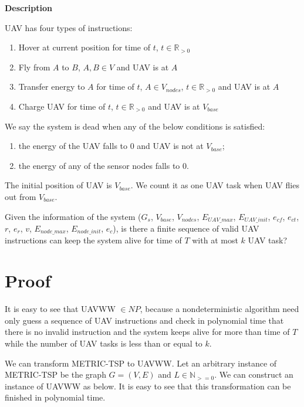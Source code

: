\documentclass[11pt]{article}
\begin{document}
\noindent
\textbf{Description}

UAV has four types of instructions:
\begin{enumerate}[noitemsep]
\item Hover at current position for time of $t$, $t \in \mathbb{R}_{>0}$
\item Fly from $A$ to $B$, $A,B \in V$ and UAV is at $A$
\item Transfer energy to $A$ for time of $t$, $A \in V_{nodes}$, $t \in \mathbb{R}_{>0}$ and UAV is at $A$
\item Charge UAV for time of $t$, $t \in \mathbb{R}_{>0}$ and UAV is at $V_{base}$
\end{enumerate}

We say the system is dead when any of the below conditions is satisfied:
\begin{enumerate}[noitemsep]
\item the energy of the UAV falls to 0 and UAV is not at $V_{base}$;
\item the energy of any of the sensor nodes falls to 0.
\end{enumerate}

The initial position of UAV is $V_{base}$. We count it as one UAV task when UAV flies out from $V_{base}$.

Given the information of the system ($G_s$, $V_{base}$, $V_{nodes}$, $E_{UAV\_max} $, $E_{UAV\_init}$, $e_{cf}$, $e_{ct}$, $r$, $e_r$, $v$, $E_{node\_max}$, $E_{node\_init}$, $e_{c}$), is there a finite sequence of valid UAV instructions can keep the system alive for time of $T$ with at most $k$ UAV task?

\section{Proof}
It is easy to see that UAVWW $\in NP$, because a nondeterministic algorithm need only guess a sequence of UAV instructions and check in polynomial time that there is no invalid instruction and the system keeps alive for more than time of $T$ while the number of UAV tasks is less than or equal to $k$.

We can transform METRIC-TSP to UAVWW. Let an arbitrary instance of METRIC-TSP be the graph $G = (V, E)$ and $L \in \mathbb{N}_{>=0}$. We can construct an instance of UAVWW as below. It is easy to see that this transformation can be finished in polynomial time.
\end{document}
